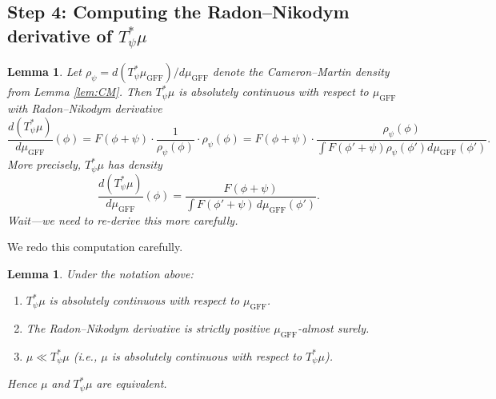 \documentclass[12pt]{article}
\newtheorem{lemma}[theorem]{Lemma}
\begin{document}
\subsection{Step 4: Computing the Radon--Nikodym derivative of $T_\psi^* \mu$}

\begin{lemma}\label{lem:RN-shifted}
Let $\rho_\psi = d(T_\psi^* \mu_{\mathrm{GFF}})/d\mu_{\mathrm{GFF}}$ denote the Cameron--Martin density from Lemma \ref{lem:CM}. Then $T_\psi^* \mu$ is absolutely continuous with respect to $\mu_{\mathrm{GFF}}$ with Radon--Nikodym derivative
\[
\frac{d(T_\psi^* \mu)}{d\mu_{\mathrm{GFF}}}(\phi) = F(\phi + \psi) \cdot \frac{1}{\rho_\psi(\phi)} \cdot \rho_\psi(\phi) = F(\phi + \psi) \cdot \frac{\rho_\psi(\phi)}{\int F(\phi'+\psi)\rho_\psi(\phi') d\mu_{\mathrm{GFF}}(\phi')}.
\]
More precisely, $T_\psi^* \mu$ has density
\begin{equation}\label{eq:RN-shifted-final}
\frac{d(T_\psi^* \mu)}{d\mu_{\mathrm{GFF}}}(\phi) = \frac{F(\phi + \psi)}{\int F(\phi' + \psi) \, d\mu_{\mathrm{GFF}}(\phi')}.
\end{equation}
Wait—we need to re-derive this more carefully.
\end{lemma}

We redo this computation carefully.

\begin{lemma}\label{lem:RN-final}
Under the notation above:
\begin{enumerate}
\item[(a)] $T_\psi^* \mu$ is absolutely continuous with respect to $\mu_{\mathrm{GFF}}$.
\item[(b)] The Radon--Nikodym derivative is strictly positive $\mu_{\mathrm{GFF}}$-almost surely.
\item[(c)] $\mu \ll T_\psi^* \mu$ (i.e., $\mu$ is absolutely continuous with respect to $T_\psi^* \mu$).
\end{enumerate}
Hence $\mu$ and $T_\psi^* \mu$ are equivalent.
\end{lemma}
\end{document}
